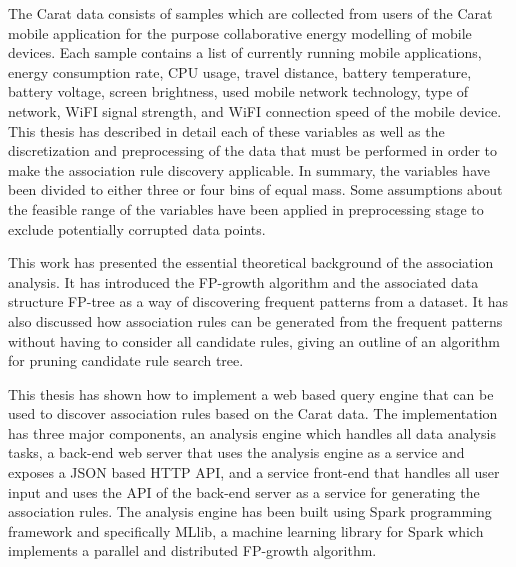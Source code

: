 The Carat data consists of samples which are collected from users of the Carat mobile application for the purpose collaborative energy modelling of mobile devices. Each sample contains a list of currently running mobile applications, energy consumption rate, CPU usage, travel distance, battery temperature, battery voltage, screen brightness, used mobile network technology, type of network,  WiFI signal strength, and WiFI connection speed of the mobile device. This thesis has described in detail each of these variables as well as the discretization and preprocessing of the data that must be performed in order to make the association rule discovery applicable. In summary, the variables have been divided to either three or four bins of equal mass. Some assumptions about the feasible range of the variables have been applied in preprocessing stage to exclude potentially corrupted data points.

This work has presented the essential theoretical background of the association analysis. It has introduced the FP-growth algorithm and the associated data structure FP-tree as a way of discovering frequent patterns from a dataset. It has also discussed how association rules can be generated from the frequent patterns without having to consider all candidate rules, giving an outline of an algorithm for pruning candidate rule search tree.

This thesis has shown how to implement a web based query engine that can be used to discover association rules based on the Carat data. The implementation has three major components, an analysis engine which handles all data analysis tasks, a back-end web server that uses the analysis engine as a service and exposes a JSON based HTTP API, and a service front-end that handles all user input and uses the API of the back-end server as a service for generating the association rules. The analysis engine has been built using Spark programming framework and specifically MLlib, a machine learning library for Spark which implements a parallel and distributed FP-growth algorithm.

